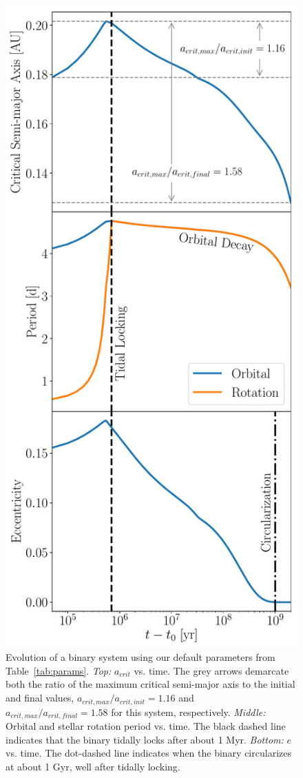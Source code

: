 \begin{figure}[h]
	\includegraphics[scale=0.5]{example.pdf}
   \caption{Evolution of a binary system using our default parameters from Table~\ref{tab:params}.  {\it Top:} $a_{crit}$ vs. time.  The grey arrows demarcate both the ratio of the maximum critical semi-major axis to the initial and final values, $a_{crit,max}/a_{crit,init} = 1.16$ and $a_{crit,max}/a_{crit,final} = 1.58$ for this system, respectively. {\it Middle:} Orbital and stellar rotation period vs. time.  The black dashed line indicates that the binary tidally locks after about 1 Myr.  {\it Bottom:} $e$ vs. time.  The dot-dashed line indicates when the binary circularizes at about 1 Gyr, well after tidally locking.}
    \label{fig:example}
\end{figure}

